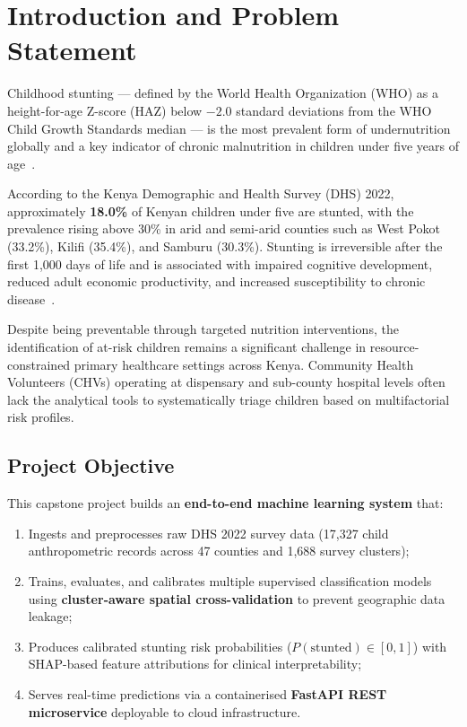 \documentclass[12pt, a4paper]{article}
\begin{document}
\tableofcontents
\newpage

\section{Introduction and Problem Statement}

Childhood stunting — defined by the World Health Organization (WHO) as a height-for-age Z-score (HAZ) below $-2.0$ standard deviations from the WHO Child Growth Standards median — is the most prevalent form of undernutrition globally and a key indicator of chronic malnutrition in children under five years of age~\cite{who2006,unicef2023}.

According to the Kenya Demographic and Health Survey (DHS) 2022, approximately \textbf{18.0\%} of Kenyan children under five are stunted, with the prevalence rising above 30\% in arid and semi-arid counties such as West Pokot (33.2\%), Kilifi (35.4\%), and Samburu (30.3\%). Stunting is irreversible after the first 1,000 days of life and is associated with impaired cognitive development, reduced adult economic productivity, and increased susceptibility to chronic disease~\cite{victora2008}.

Despite being preventable through targeted nutrition interventions, the identification of at-risk children remains a significant challenge in resource-constrained primary healthcare settings across Kenya. Community Health Volunteers (CHVs) operating at dispensary and sub-county hospital levels often lack the analytical tools to systematically triage children based on multifactorial risk profiles.

\subsection{Project Objective}

This capstone project builds an \textbf{end-to-end machine learning system} that:

\begin{enumerate}[label=\roman*.]
    \item Ingests and preprocesses raw DHS 2022 survey data (17,327 child anthropometric records across 47 counties and 1,688 survey clusters);
    \item Trains, evaluates, and calibrates multiple supervised classification models using \textbf{cluster-aware spatial cross-validation} to prevent geographic data leakage;
    \item Produces calibrated stunting risk probabilities ($P(\text{stunted}) \in [0, 1]$) with SHAP-based feature attributions for clinical interpretability;
    \item Serves real-time predictions via a containerised \textbf{FastAPI REST microservice} deployable to cloud infrastructure.
\end{enumerate}
\end{document}
